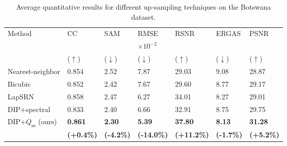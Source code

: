 \documentclass[journal]{IEEEtran}
\begin{document}
    \begin{table}[tb]
        \centering
        \caption{Average quantitative results for different up-sampling techniques on the Botswana dataset.}
        \begin{tabular}{lp{0.5cm}p{0.6cm}p{0.7cm}p{0.6cm}p{0.7cm}p{0.6cm}}
        \hline
        \multirow{3}{*}{Method} & CC   & SAM & RMSE  & RSNR   & ERGAS       & PSNR \\
        & & & $\times 10^{-2}$ & & & \\
        & ($\uparrow$) & ($\downarrow$) & ($\downarrow$) & ($\uparrow$) & ($\downarrow$) & ($\uparrow$)\\
        \hline
        Nearest-neighbor    & 0.854 & 2.52  & 7.87  & 29.03 & 9.08 & 28.87\\
        Bicubic             & 0.852 & 2.42  & 7.67  & 29.60 & 8.77 & 29.17\\
        LapSRN \cite{LapSRN}& 0.858 & 2.47  & 6.27  & 34.01 & 8.27 & 29.01\\
        DIP+spectral  \cite{DHP-DARN}  & 0.833 & 2.40  & 6.66   & 32.91 & 8.75  & 29.75\\
        DIP+$Q_{\text{ss}}$ (ours)& \textbf{0.861}   & \textbf{2.30}   & \textbf{5.39}     & \textbf{37.80}    & \textbf{8.13}       & \textbf{31.28}\\
                            & \textbf{\tiny(+0.4\%)} &  \textbf{\tiny(-4.2\%)}          & \textbf{\tiny(-14.0\%)} &    \textbf{\tiny(+11.2\%)} & \textbf{\tiny(-1.7\%)} & \textbf{\tiny(+5.2\%)} \\
        \hline
        \end{tabular}
        \label{tab:botswana_lambda_tune_qt}
    \end{table}
\end{document}

